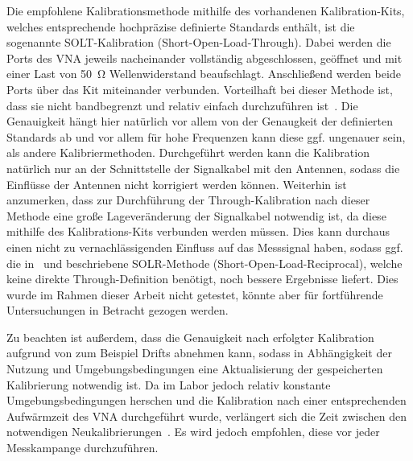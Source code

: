 Die empfohlene Kalibrationsmethode mithilfe des vorhandenen Kalibration-Kits, welches entsprechende hochpräzise definierte Standards enthält, ist die sogenannte SOLT-Kalibration (Short-Open-Load-Through). Dabei werden die Ports des VNA jeweils nacheinander vollständig abgeschlossen, geöffnet und mit einer Last von \SI{50}{\ohm} Wellenwiderstand beaufschlagt. Anschließend werden beide Ports über das Kit miteinander verbunden. Vorteilhaft bei dieser Methode ist, dass sie nicht bandbegrenzt und relativ einfach durchzuführen ist~\cite{VNA-Calibration_Application_Note}. Die Genauigkeit hängt hier natürlich vor allem von der Genaugkeit der definierten Standards ab und vor allem für hohe Frequenzen kann diese ggf. ungenauer sein, als andere Kalibriermethoden. Durchgeführt werden kann die Kalibration natürlich nur an der Schnittstelle der Signalkabel mit den Antennen, sodass die Einflüsse der Antennen nicht korrigiert werden können. Weiterhin ist anzumerken, dass zur Durchführung der \glqq Through\grqq-Kalibration nach dieser Methode eine große Lageveränderung der Signalkabel notwendig ist, da diese mithilfe des Kalibrations-Kits verbunden werden müssen. Dies kann durchaus einen nicht zu vernachlässigenden Einfluss auf das Messsignal haben, sodass ggf. die in~\cite{VNA-Handbuch} und \cite{VNA-Calibration_Application_Note} beschriebene SOLR-Methode (Short-Open-Load-Reciprocal), welche keine direkte \glqq Through\grqq-Definition benötigt, noch bessere Ergebnisse liefert. Dies wurde im Rahmen dieser Arbeit nicht getestet, könnte aber für fortführende Untersuchungen in Betracht gezogen werden.
\par
\vspace{\linespace}
Zu beachten ist außerdem, dass die Genauigkeit nach erfolgter Kalibration aufgrund von zum Beispiel Drifts abnehmen kann, sodass in Abhängigkeit der Nutzung und Umgebungsbedingungen eine Aktualisierung der gespeicherten Kalibrierung notwendig ist. Da im Labor jedoch relativ konstante Umgebungsbedingungen herschen und die Kalibration nach einer entsprechenden Aufwärmzeit des VNA durchgeführt wurde, verlängert sich die Zeit zwischen den notwendigen Neukalibrierungen~\cite{VNA-Handbuch, VNA_Error_Models_and_Calibration_Methods}. Es wird jedoch empfohlen, diese vor jeder Messkampange durchzuführen.










